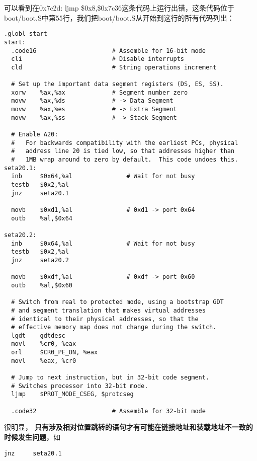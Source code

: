 \documentclass{article}
\newcommand{\highlight}[1]{{\bfseries \color{red}  #1}}
\begin{document}
\begin{CJK*}{UTF8}{gkai}
可以看到在0x7c2d:\hspace{1ex} ljmp \hspace{0.5ex} \$0x8,\$0x7c36这条代码上运行出错，这条代码位于boot/boot.S中第55行，我们把boot/boot.S从开始到这行的所有代码列出：

\begin{lstlisting}[style=acode, firstnumber=12, title={\scriptsize \ttfamily \bfseries boot/boot.S}]
.globl start
start:
  .code16                     # Assemble for 16-bit mode
  cli                         # Disable interrupts
  cld                         # String operations increment

  # Set up the important data segment registers (DS, ES, SS).
  xorw    %ax,%ax             # Segment number zero
  movw    %ax,%ds             # -> Data Segment
  movw    %ax,%es             # -> Extra Segment
  movw    %ax,%ss             # -> Stack Segment

  # Enable A20:
  #   For backwards compatibility with the earliest PCs, physical
  #   address line 20 is tied low, so that addresses higher than
  #   1MB wrap around to zero by default.  This code undoes this.
seta20.1:
  inb     $0x64,%al               # Wait for not busy
  testb   $0x2,%al
  jnz     seta20.1

  movb    $0xd1,%al               # 0xd1 -> port 0x64
  outb    %al,$0x64

seta20.2:
  inb     $0x64,%al               # Wait for not busy
  testb   $0x2,%al
  jnz     seta20.2

  movb    $0xdf,%al               # 0xdf -> port 0x60
  outb    %al,$0x60

  # Switch from real to protected mode, using a bootstrap GDT
  # and segment translation that makes virtual addresses 
  # identical to their physical addresses, so that the 
  # effective memory map does not change during the switch.
  lgdt    gdtdesc
  movl    %cr0, %eax
  orl     $CR0_PE_ON, %eax
  movl    %eax, %cr0
  
  # Jump to next instruction, but in 32-bit code segment.
  # Switches processor into 32-bit mode.
  ljmp    $PROT_MODE_CSEG, $protcseg

  .code32                     # Assemble for 32-bit mode
\end{lstlisting}

很明显，\highlight{只有涉及相对位置跳转的语句才有可能在链接地址和装载地址不一致的时候发生问题}，如

\begin{lstlisting}[style=acode, firstnumber=31]
  jnz     seta20.1
\end{lstlisting}


\end{CJK*}
\end{document}
